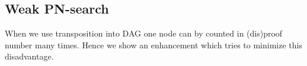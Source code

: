 %
%
%
%
%

\subsection{Weak PN-search} \label{weak}

When we use transposition into DAG one node can by counted in (dis)proof number many times.
Hence we show an enhancement which tries to minimize this disadvantage. 

